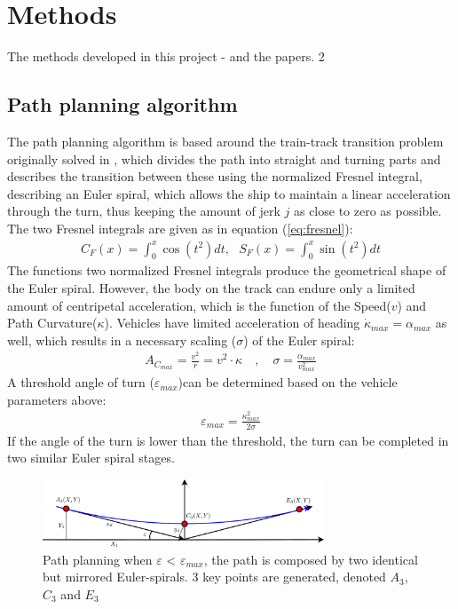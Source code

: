 \documentclass{ifacconf}
\begin{document}
\section{Methods}

The methods developed in this project - and the papers. 2

\subsection{Path planning algorithm}

The path planning algorithm is based around the train-track transition problem originally solved in \citep{Art:1}, which divides the path into straight and turning parts and describes the transition between these using the normalized Fresnel integral, describing an Euler spiral, which allows the ship to maintain a linear acceleration through the turn, thus keeping the amount of jerk $j$ as close to zero as possible. The two Fresnel integrals are given as in equation (\ref{eq:fresnel}):
\begin{align}
C_F(x) = \int_0^x \cos(t^2)dt,\,\,\,\,S_F(x) = \int_0^x \sin(t^2)dt
\label{eq:fresnel}
\end{align}
The functions two normalized Fresnel integrals produce the geometrical shape of the Euler spiral. However, the body on the track can endure only a limited amount of centripetal acceleration, which is the function of the Speed($v$) and Path Curvature($\kappa$). Vehicles have limited acceleration of heading $\dot{\kappa}_{max} = \alpha_{max}$ as well, which results in a necessary scaling ($\sigma$) of the Euler spiral:
\begin{align}
A_{C_{max}} = \frac{v^2}{r} = v^2 \cdot \kappa \quad , \quad \sigma = \frac{\alpha_{max}}{v^2_{max}}
\end{align}
A threshold angle of turn ($\varepsilon_{max}$)can be determined based on the vehicle parameters above:
\begin{align}
\varepsilon_{max} = \frac{\kappa^2_{max}}{2\sigma}
\end{align}
If the angle of the turn is lower than the threshold, the turn can be completed in two similar Euler spiral stages.
\begin{figure}
	\begin{center}
		\includegraphics[width=8.4cm]{img/3Points} %
		\caption{Path planning when $\varepsilon$ < $\varepsilon_{max}$, the path is composed by two identical but mirrored Euler-spirals. 3 key points are generated, denoted $A_3$, $C_3$ and $E_3$}
		\label{fig:3points}
	\end{center}
\end{figure}
\end{document}
